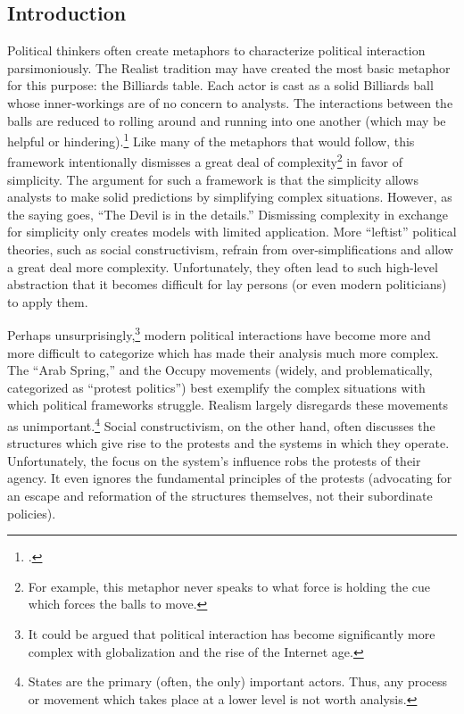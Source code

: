 \documentclass[openany,twoside]{memoir}
\begin{document}
\begin{Spacing}{2}
\chapter{Introduction}
\thispagestyle{fancy}
Political thinkers often create metaphors to characterize political interaction parsimoniously.
The Realist tradition may have created the most basic metaphor for this purpose: the Billiards table.
Each actor is cast as a solid Billiards ball whose inner-workings are of no concern to analysts.
The interactions between the balls are reduced to rolling around and running into one another (which may be helpful or hindering).\footcite{mearsheimer01}
Like many of the metaphors that would follow, this framework intentionally dismisses a great deal of complexity\footnote{
For example, this metaphor never speaks to what force is holding the cue which forces the balls to move.}
in favor of simplicity.
The argument for such a framework is that the simplicity allows analysts to make solid predictions by simplifying complex situations.
However, as the saying goes, ``The Devil is in the details.''
Dismissing complexity in exchange for simplicity only creates models with limited application.
More ``leftist'' political theories, such as social constructivism, refrain from over-simplifications and allow a great deal more complexity.
Unfortunately, they often lead to such high-level abstraction that it becomes difficult for lay persons (or even modern politicians) to apply them.

Perhaps unsurprisingly,\footnote{
It could be argued that political interaction has become significantly more complex with globalization and the rise of the Internet age.}
modern political interactions have become more and more difficult to categorize which has made their analysis much more complex.
The ``Arab Spring,'' and the Occupy movements (widely, and problematically, categorized as ``protest politics'') best exemplify the complex situations with which political frameworks struggle.
Realism largely disregards these movements as unimportant.\footnote{
States are the primary (often, the only) important actors.
Thus, any process or movement which takes place at a lower level is not worth analysis.}
Social constructivism, on the other hand, often discusses the structures which give rise to the protests and the systems in which they operate.
Unfortunately, the focus on the system's influence robs the protests of their agency.
It even ignores the fundamental principles of the protests (advocating for an escape and reformation of the structures themselves, not their subordinate policies).


\end{Spacing}
\end{document}
